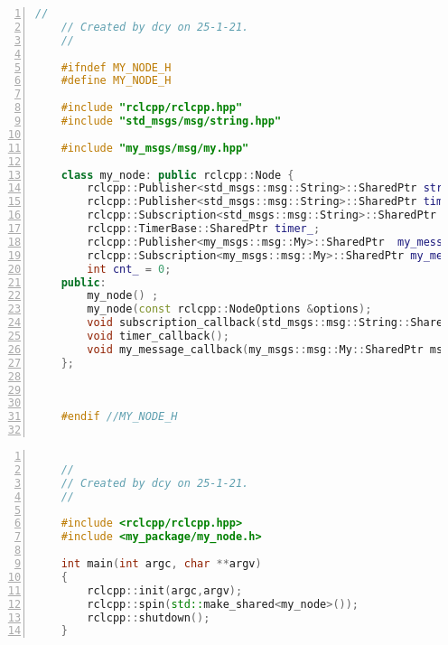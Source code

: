 \begin{lstlisting}[language=c++,label=lst:my_node_h,caption=my\_node.h,numbers=left]
    //
    // Created by dcy on 25-1-21.
    //
    
    #ifndef MY_NODE_H
    #define MY_NODE_H
    
    #include "rclcpp/rclcpp.hpp"
    #include "std_msgs/msg/string.hpp"
    
    #include "my_msgs/msg/my.hpp"
    
    class my_node: public rclcpp::Node {
        rclcpp::Publisher<std_msgs::msg::String>::SharedPtr string_publisher_;
        rclcpp::Publisher<std_msgs::msg::String>::SharedPtr timer_publisher_;
        rclcpp::Subscription<std_msgs::msg::String>::SharedPtr string_subscription_;
        rclcpp::TimerBase::SharedPtr timer_;
        rclcpp::Publisher<my_msgs::msg::My>::SharedPtr  my_message_publisher_;
        rclcpp::Subscription<my_msgs::msg::My>::SharedPtr my_message_subscription_;
        int cnt_ = 0;
    public:
        my_node() ;
        my_node(const rclcpp::NodeOptions &options);
        void subscription_callback(std_msgs::msg::String::SharedPtr msg);
        void timer_callback();
        void my_message_callback(my_msgs::msg::My::SharedPtr msg);
    };
    
    
    
    #endif //MY_NODE_H
    
\end{lstlisting}

\begin{lstlisting}[language=c++,label=lst:node_run_cpp,caption=node\_run.cpp,numbers=left]

    //
    // Created by dcy on 25-1-21.
    //

    #include <rclcpp/rclcpp.hpp>
    #include <my_package/my_node.h>

    int main(int argc, char **argv)
    {
        rclcpp::init(argc,argv);
        rclcpp::spin(std::make_shared<my_node>());
        rclcpp::shutdown();
    }

\end{lstlisting}


